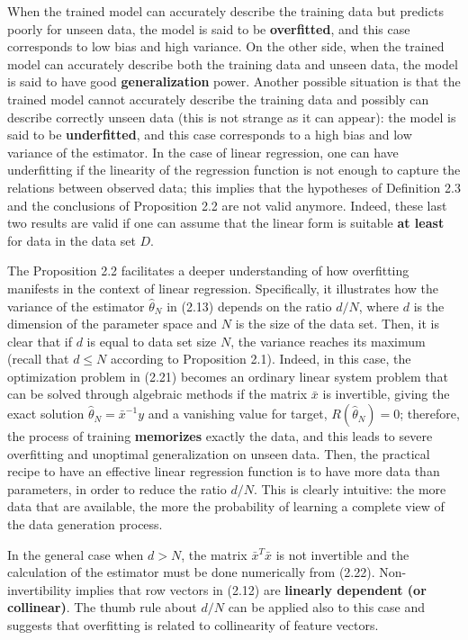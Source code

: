 \documentclass{report}
\begin{document}
When the trained model can accurately describe the training data but predicts poorly for unseen data, the model is said to be \textbf{overfitted}, and this case corresponds to low bias and high variance. On the other side, when the trained model can accurately describe both the training data and unseen data, the model is said to have good \textbf{generalization} power. Another possible situation is that the trained model cannot accurately describe the training data and possibly can describe correctly unseen data (this is not strange as it can appear): the model is said to be \textbf{underfitted}, and this case corresponds to a high bias and low variance of the estimator. In the case of linear regression, one can have underfitting if the linearity of the regression function is not enough to capture the relations between observed data; this implies that the hypotheses of Definition 2.3 and the conclusions of Proposition 2.2 are not valid anymore. Indeed, these last two results are valid if one can assume that the linear form is suitable \textbf{at least} for data in the data set $D$.

The Proposition 2.2 facilitates a deeper understanding of how overfitting manifests in the context of linear regression. Specifically, it illustrates how the variance of the estimator $\hat{\theta}_N$ in (2.13) depends on the ratio $d/N$, where $d$ is the dimension of the parameter space and $N$ is the size of the data set. Then, it is clear that if $d$ is equal to data set size $N$, the variance reaches its maximum (recall that $d \leq N$ according to Proposition 2.1). Indeed, in this case, the optimization problem in (2.21) becomes an ordinary linear system problem that can be solved through algebraic methods if the matrix $\bar{x}$ is invertible, giving the exact solution $\hat{\theta}_N = \bar{x}^{-1}y$ and a vanishing value for target, $R(\hat{\theta}_N) = 0$; therefore, the process of training \textbf{memorizes} exactly the data, and this leads to severe overfitting and unoptimal generalization on unseen data. Then, the practical recipe to have an effective linear regression function is to have more data than parameters, in order to reduce the ratio $d/N$. This is clearly intuitive: the more data that are available, the more the probability of learning a complete view of the data generation process.

In the general case when $d > N$, the matrix $\bar{x}^T\bar{x}$ is not invertible and the calculation of the estimator must be done numerically from (2.22). Non-invertibility implies that row vectors in (2.12) are \textbf{linearly dependent (or collinear)}. The thumb rule about $d/N$ can be applied also to this case and suggests that overfitting is related to collinearity of feature vectors.
\end{document}
